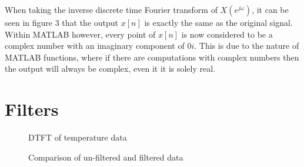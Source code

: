 \documentclass[a4paper,11pt]{article}
\begin{document}
When taking the inverse discrete time Fourier transform of $X(e^{j\omega})$, it can be seen in figure 3 that the output $x[n]$ is exactly the same as the original signal. Within MATLAB however, every point of $x[n]$ is now considered to be a complex number with an imaginary component of $0i$. This is due to the nature of MATLAB functions, where if there are computations with complex numbers then the output will always be complex, even it it is solely real.

\pagebreak
\section{Filters}
\begin{figure}[h]
 \begin{center}
  \caption{DTFT of temperature data}
  \vspace{-20pt}
 \end{center}
\end{figure}


\begin{figure}[h]
 \begin{center}
 \vspace{-10pt}
  \caption{Comparison of un-filtered and filtered data}
  \vspace{-60pt}
 \end{center}
\end{figure}
\end{document}
